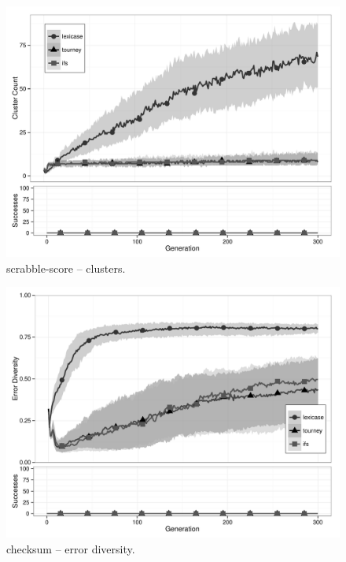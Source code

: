 \begin{figure}[p] %
\centering
\includegraphics[width=11.5cm]{scrabble-score-cluster.pdf}
\caption{scrabble-score -- clusters.}
\label{scrabble-scoreClu}
\end{figure}

\begin{figure}[p] %
\centering
\includegraphics[width=11.5cm]{checksum-diversity.pdf}
\caption{checksum -- error diversity.}
\label{checksumDiv}
\end{figure}

